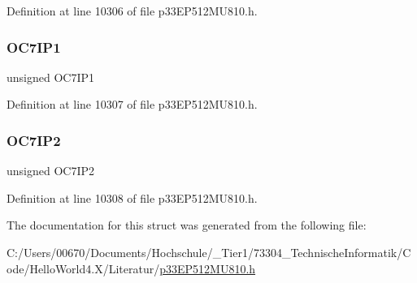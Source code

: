Definition at line 10306 of file p33\+E\+P512\+M\+U810.\+h.

\mbox{\label{structtag_i_p_c10_b_i_t_s_a9f600be35e69046f9a66c4d416b378c8}} 
\subsubsection{\texorpdfstring{O\+C7\+I\+P1}{OC7IP1}}
{\footnotesize\ttfamily unsigned O\+C7\+I\+P1}



Definition at line 10307 of file p33\+E\+P512\+M\+U810.\+h.

\mbox{\label{structtag_i_p_c10_b_i_t_s_abab8cac4bb1b371fee6ae7dd78ad2312}} 
\subsubsection{\texorpdfstring{O\+C7\+I\+P2}{OC7IP2}}
{\footnotesize\ttfamily unsigned O\+C7\+I\+P2}



Definition at line 10308 of file p33\+E\+P512\+M\+U810.\+h.



The documentation for this struct was generated from the following file\+:\begin{DoxyCompactItemize}
\item 
C\+:/\+Users/00670/\+Documents/\+Hochschule/\+\_\+\+Tier1/73304\+\_\+\+Technische\+Informatik/\+Code/\+Hello\+World4.\+X/\+Literatur/\hyperlink{p33_e_p512_m_u810_8h}{p33\+E\+P512\+M\+U810.\+h}\end{DoxyCompactItemize}
